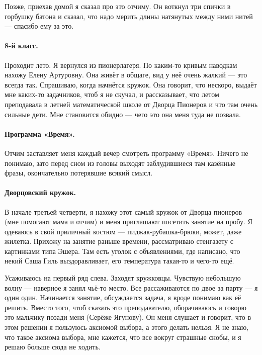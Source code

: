\documentclass{book}
\begin{document}
Позже, приехав домой я сказал про это отчиму.
Он воткнул три спички в горбушку батона и сказал, что надо мерить длины натянутых между ними нитей --- спасибо ему за это.



\paragraph{8-й класс.}
Проходит лето. 
Я вернулся из пионерлагеря.
По каким-то кривым наводкам нахожу Елену Артуровну.
Она живёт в общаге, вид у неё очень жалкий --- это всегда так.
Спрашиваю, когда начнётся кружок.
Она говорит, что нескоро,
выдаёт мне каких-то задачников, чтоб я не скучал,
и рассказывает, что летом преподавала в летней математической школе от Дворца Пионеров и что там очень сильные дети.
Мне становится обидно --- чего это она меня туда не позвала.

\paragraph{Программа «Время».}
Отчим заставляет меня каждый вечер смотреть программу «Время».
Ничего не понимаю, зато перед сном из головы выходят 
заблудившиеся там казённые фразы, окончательно потерявшие всякий смысл.

\paragraph{Дворцовский кружок.}
В начале третьей четверти,
я нахожу этот самый кружок от Дворца пионеров (мне помогают мама и отчим) и меня приглашают посетить занятие на пробу.
Я одеваюсь в свой приличный костюм --- пиджак-рубашка-брюки, может, даже жилетка.
Прихожу на занятие раньше времени, рассматриваю стенгазету с картинками типа Эшера.
Там есть уголок с объявлениями, где написано, что некий Саша Гиль выздоравливает, его температура такая-то и чего-то ещё.

Усаживаюсь на первый ряд слева.
Заходят кружковцы.
Чувствую небольшую волну --- наверное я занял чьё-то место.
Все рассаживаются по двое за парту --- я один один.
Начинается занятие, обсуждается задача, я вроде понимаю как её решить.
Вместо того, чтоб сказать это преподавателю, оборачиваюсь и говорю это мальчику позади меня 
(Серёже Ягунову).
Он меня слушает и говорит, что в этом решении я пользуюсь аксиомой выбора, а этого делать нельзя.
Я не знаю, что такое аксиома выбора, мне кажется, что все вокруг страшные снобы, и я решаю больше сюда не ходить.
\end{document}
